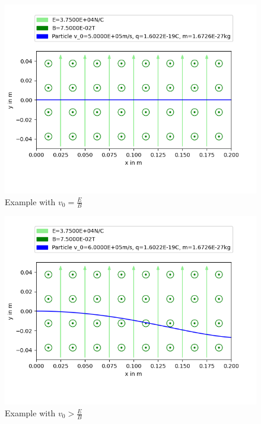 \documentclass[english, a4paper, 10pt]{article}
\begin{document}
\begin{figure}[ht]
\caption{Example with $v_0=\frac{E}{B}$}
\centering
\includegraphics[width=\textwidth]{figure_3}
\end{figure}
\begin{figure}[ht]
\caption{Example with $v_0>\frac{E}{B}$}
\centering
\includegraphics[width=\textwidth]{figure_1}
\end{figure}
\end{document}
